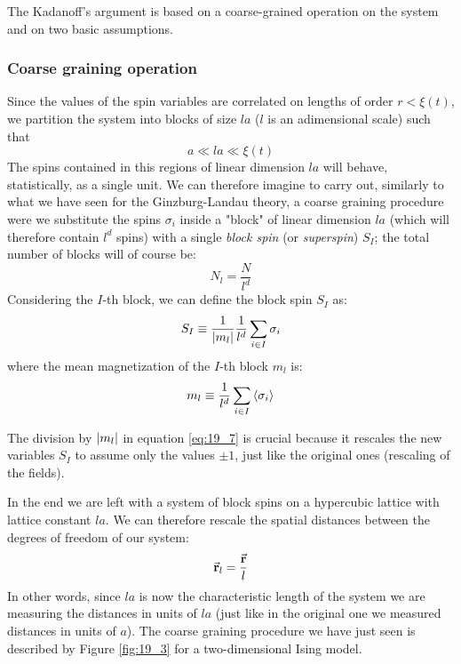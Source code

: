 \documentclass[../main/main.tex]{subfiles}
\begin{document}
The Kadanoff's argument is based on a coarse-grained operation on the system and on two basic assumptions.

\subsubsection{Coarse graining operation}
Since the values of the spin variables are correlated on lengths of order \( r < \xi (t) \), we partition the system into blocks of size \( la \) (\( l \) is an adimensional scale) such that
\begin{equation*}
a \ll l a \ll \xi (t)
\end{equation*}
The spins contained in this regions of linear dimension \( la \) will behave, statistically, as a single unit.
We can therefore imagine to carry out, similarly to what we have seen for the Ginzburg-Landau theory, a coarse graining procedure were we substitute the spins \( \sigma _i \)  inside a "block" of linear dimension \( la \)  (which will therefore contain \( l^d \)  spins) with a single \emph{block spin} (or \emph{superspin}) \( S_I \); the total number of blocks will of course be:
\begin{equation*}
  N_l = \frac{N}{l^d}
\end{equation*}
 Considering the \( I \)-th block, we can define the block spin \( S_I \) as:
\begin{equation}
  S_I \equiv \frac{1}{\abs{m_l} } \frac{1}{l^d} \sum_{i \in I}^{}  \sigma _i
  \label{eq:19_7}
\end{equation}
where the mean magnetization of the \( I \)-th block \( m_l \) is:
\begin{equation}
  m_l \equiv \frac{1}{l^d} \sum_{i \in I}^{} \expval{ \sigma _i }
\end{equation}

\begin{remark}
The division by \( \abs{m_l}  \) in equation \eqref{eq:19_7} is crucial because it rescales the new variables \( S_I \) to assume only the values \( \pm 1 \), just like the original ones (rescaling of the fields).
\end{remark}

In the end we are left with a system of block spins on a hypercubic lattice with lattice constant \( la \). We can therefore rescale the spatial distances between the degrees of freedom of our system:
\begin{equation*}
  \va{r}_l = \frac{\va{r}}{l}
\end{equation*}
In other words, since \( la \) is now the characteristic length of the system we are measuring the distances in units of \( la \)  (just like in the original one we measured distances in units of \( a \)). The coarse graining procedure we have just seen is described by Figure \ref{fig:19_3} for a two-dimensional Ising model.
\end{document}

